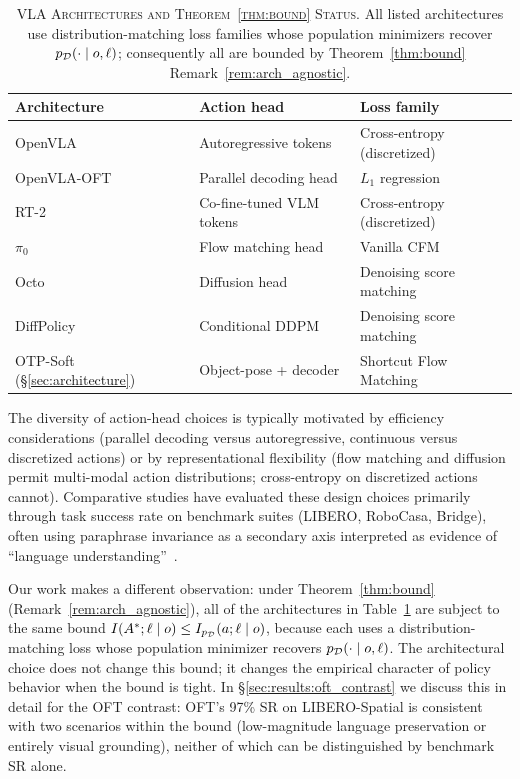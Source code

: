\begin{table}[t]
\centering
\caption{\textsc{VLA Architectures and Theorem~\ref{thm:bound} Status.}
All listed architectures use distribution-matching loss families whose population
minimizers recover $p_{\mathcal{D}}(\cdot \mid o, \ell)$; consequently all are bounded by
Theorem~\ref{thm:bound} Remark~\ref{rem:arch_agnostic}.}
\label{tab:vla_archs}
\small
\begin{tabular}{lll}
\toprule
\textbf{Architecture} & \textbf{Action head} & \textbf{Loss family} \\
\midrule
OpenVLA~\cite{kim2024openvla}      & Autoregressive tokens   & Cross-entropy (discretized) \\
OpenVLA-OFT~\cite{kim2025openvla_oft} & Parallel decoding head  & $L_1$ regression \\
RT-2~\cite{brohan2023rt2}           & Co-fine-tuned VLM tokens & Cross-entropy (discretized) \\
$\pi_0$~\cite{black2024pi0}         & Flow matching head      & Vanilla CFM \\
Octo~\cite{octo2024}                & Diffusion head          & Denoising score matching \\
DiffPolicy~\cite{chi2023diffusion}  & Conditional DDPM        & Denoising score matching \\
OTP-Soft (\S\ref{sec:architecture}) & Object-pose + decoder   & Shortcut Flow Matching \\
\bottomrule
\end{tabular}
\end{table}

The diversity of action-head choices is typically motivated by efficiency considerations
(parallel decoding versus autoregressive, continuous versus discretized actions) or by
representational flexibility (flow matching and diffusion permit multi-modal action
distributions; cross-entropy on discretized actions cannot). Comparative studies have
evaluated these design choices primarily through task success rate on benchmark suites
(LIBERO, RoboCasa, Bridge), often using paraphrase invariance as a secondary axis
interpreted as evidence of ``language understanding''~\cite{kim2025openvla_oft}.

Our work makes a different observation: under Theorem~\ref{thm:bound}
(Remark~\ref{rem:arch_agnostic}), all of the architectures in Table~\ref{tab:vla_archs}
are subject to the same bound $I(A^{*}; \ell \mid o) \le I_{p_{\mathcal{D}}}(a; \ell \mid o)$,
because each uses a distribution-matching loss whose population minimizer recovers
$p_{\mathcal{D}}(\cdot \mid o, \ell)$. The architectural choice does not change this bound; it
changes the empirical character of policy behavior when the bound is tight. In
\S\ref{sec:results:oft_contrast} we discuss this in detail for the OFT contrast: OFT's
97\% SR on LIBERO-Spatial is consistent with two scenarios within the bound (low-magnitude
language preservation or entirely visual grounding), neither of which can be distinguished
by benchmark SR alone.

